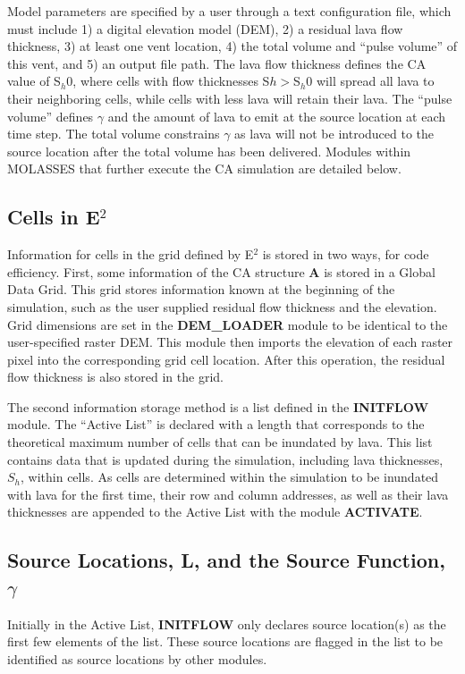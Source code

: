 \documentclass[12pt,letter]{article}
\begin{document}
		Model parameters are specified by a user through a text configuration file, which must include 1) a digital elevation model (DEM), 2) a residual lava flow thickness, 3) at least one vent location, 4) the total volume and ``pulse volume'' of this vent, and 5) an output file path. The lava flow thickness defines the CA value of S$_h0$, where cells with flow thicknesses S$h>$S$_h0$ will spread all lava to their neighboring cells, while cells with less lava will retain their lava. The ``pulse volume'' defines $\gamma$ and the amount of lava to emit at the source location at each time step. The total volume constrains $\gamma$ as lava will not be introduced to the source location after the total volume has been delivered. Modules within MOLASSES that further execute the CA simulation are detailed below.
		
	\subsection{Cells in E$^2$}
		Information for cells in the grid defined by E$^2$ is stored in two ways, for code efficiency. First, some information of the CA structure \textbf{A} is stored in a Global Data Grid. This grid stores information known at the beginning of the simulation, such as the user supplied residual flow thickness and the elevation. Grid dimensions are set in the \textbf{DEM\_LOADER} module to be identical to the user-specified raster DEM. This module then imports the elevation of each raster pixel into the corresponding grid cell location. After this operation, the residual flow thickness is also stored in the grid.

		The second information storage method is a list defined in the \textbf{INITFLOW} module. The ``Active List'' is declared with a length that corresponds to the theoretical maximum number of cells that can be inundated by lava. This list contains data that is updated during the simulation, including lava thicknesses, $S_h$, within cells. As cells are determined within the simulation to be inundated with lava for the first time, their row and column addresses, as well as their lava thicknesses are appended to the Active List with the module \textbf{ACTIVATE}.
		
	\subsection{Source Locations, L, and the Source Function, $\gamma$}
		Initially in the Active List, \textbf{INITFLOW} only declares source location(s) as the first few elements of the list. These source locations are flagged in the list to be identified as source locations by other modules.
\end{document}
